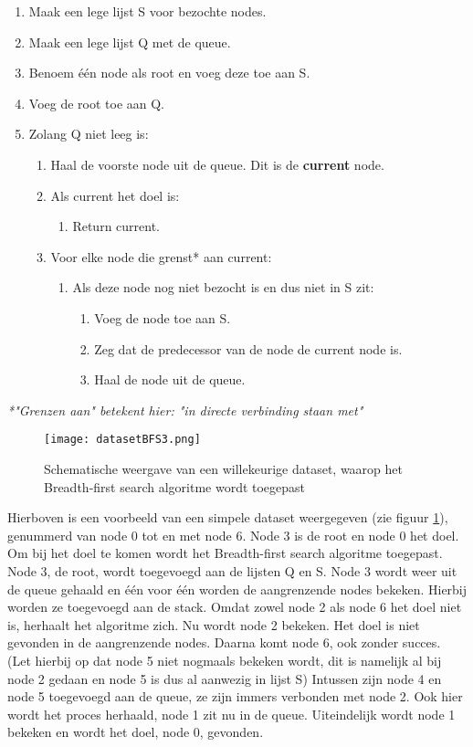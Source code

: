 \begin{enumerate}
\item Maak een lege lijst S voor bezochte nodes.
\item Maak een lege lijst Q met de queue.
\item Benoem \'e\'en node als root en voeg deze toe aan S.
\item Voeg de root toe aan Q. 
\item Zolang Q niet leeg is:
	\begin{enumerate}
	\item Haal de voorste node uit de queue. Dit is de \textbf{current} node.
	\item Als current het doel is:
		\begin{enumerate}
		\item Return current.
		\end{enumerate}
	\item Voor elke node die grenst* aan current:
		\begin{enumerate}
		\item Als deze node nog niet bezocht is en dus niet in S zit:
			\begin{enumerate}
			\item Voeg de node toe aan S.
			\item Zeg dat de predecessor van de node de current node is.
			\item Haal de node uit de queue.
			\end{enumerate}
		\end{enumerate}
	\end{enumerate}
\end{enumerate}

\textit{*"Grenzen aan" betekent hier: "in directe verbinding staan met"}

\begin{figure}[H]
  \centering
    \texttt{[image: datasetBFS3.png]}
  \caption{Schematische weergave van een willekeurige dataset, waarop het Breadth-first search algoritme wordt toegepast}
  \label{fig:datasetBFS3}
\end{figure}

Hierboven is een voorbeeld van een simpele dataset weergegeven (zie figuur \ref{fig:datasetBFS3}), genummerd van node 0 tot en met node 6. Node 3 is de root en node 0 het doel. Om bij het doel te komen wordt het Breadth-first search algoritme toegepast. Node 3, de root, wordt toegevoegd aan de lijsten Q en S. Node 3 wordt weer uit de queue gehaald en \'e\'en voor \'e\'en worden de aangrenzende nodes bekeken. Hierbij worden ze toegevoegd aan de stack. Omdat zowel node 2 als node 6 het doel niet is, herhaalt het algoritme zich. Nu wordt node 2 bekeken. Het doel is niet gevonden in de aangrenzende nodes. Daarna komt node 6, ook zonder succes. (Let hierbij op dat node 5 niet nogmaals bekeken wordt, dit is namelijk al bij node 2 gedaan en node 5 is dus al aanwezig in lijst S) Intussen zijn node 4 en node 5 toegevoegd aan de queue, ze zijn immers verbonden met node 2. Ook hier wordt het proces herhaald, node 1 zit nu in de queue. Uiteindelijk wordt node 1 bekeken en wordt het doel, node 0, gevonden.

